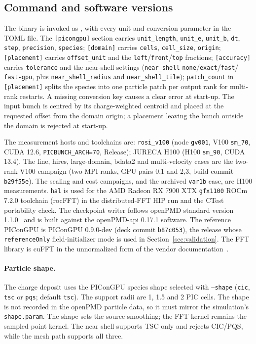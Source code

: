 \subsection{Command and software versions}
\label{sec:commands}

The binary is invoked as
,
with every unit and conversion parameter in the TOML file. The
\texttt{[picongpu]} section carries \texttt{unit\_length},
\texttt{unit\_e}, \texttt{unit\_b}, \texttt{dt}, \texttt{step},
\texttt{precision}, \texttt{species}; \texttt{[domain]} carries
\texttt{cells}, \texttt{cell\_size}, \texttt{origin};
\texttt{[placement]} carries \texttt{offset\_unit} and the
\texttt{left}/\texttt{front}/\texttt{top} fractions; \texttt{[accuracy]}
carries \texttt{tolerance} and the near-shell settings
(\texttt{near\_shell} \texttt{none}/\texttt{exact}/\texttt{fast}/
\texttt{fast-gpu}, plus \texttt{near\_shell\_radius} and
\texttt{near\_shell\_tile}); \texttt{patch\_count} in \texttt{[placement]}
splits the species into one particle patch per output rank for multi-rank
restarts. A missing conversion key causes a clear error at start-up. The
input bunch is centred by its charge-weighted centroid and placed at the
requested offset from the domain origin; a placement leaving the bunch
outside the domain is rejected at start-up.

The measurement hosts and toolchains are: \texttt{rosi\_v100} (node
\texttt{gv001}, V100 \texttt{sm\_70}, CUDA 12.6,
\texttt{PICBUNCH\_ARCH=70}, Release); JURECA H100 (H100
\texttt{sm\_90}, CUDA 13.4). The line, hires, large-domain, bdata2 and
multi-velocity cases are the two-rank V100 campaign (two MPI ranks, GPU
pairs 0,1 and 2,3, build commit \texttt{b29f55e}). The scaling and cost
campaigns, and the archived \texttt{var1b} case, are H100 measurements.
\texttt{hal} is used for the AMD Radeon RX 7900 XTX \texttt{gfx1100} ROCm 7.2.0 toolchain
(rocFFT) in the distributed-FFT HIP run and the CTest portability check. The checkpoint writer follows openPMD standard version
1.1.0~\citep{openpmd} and is built against the openPMD-api 0.17.1 software.
The reference PIConGPU is PIConGPU 0.9.0-dev (deck commit \texttt{b87c053}),
the release whose \texttt{referenceOnly} field-initializer mode is used in
Section~\ref{sec:validation}. The FFT library is cuFFT in the unnormalized
form of the vendor documentation~\citep{cufft2024}.

\paragraph{Particle shape.}
The charge deposit uses the PIConGPU species shape selected with
\texttt{--shape} (\texttt{cic}, \texttt{tsc} or \texttt{pqs}; default
\texttt{tsc}).  The support radii are 1, 1.5 and 2 PIC cells.  The shape is not
recorded in the openPMD particle data, so it must mirror the simulation's
\texttt{shape.param}.  The shape sets the source smoothing; the FFT kernel
remains the sampled point kernel.  The near shell supports TSC only and
rejects CIC/PQS, while the mesh path supports all three.

